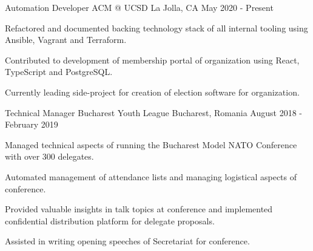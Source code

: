 
\begin{cventries}
  \cventry
    {Automation Developer}
    {ACM @ UCSD}
    {La Jolla, CA}
    {May 2020 - Present}
    {
      \begin{cvitems}
        \item {Refactored and documented backing technology stack of all internal tooling using Ansible, Vagrant and Terraform.}
        \item {Contributed to development of membership portal of organization using React, TypeScript and PostgreSQL.}
        \item {Currently leading side-project for creation of election software for organization.}
      \end{cvitems}
    }
  \cventry
    {Technical Manager}
    {Bucharest Youth League}
    {Bucharest, Romania}
    {August 2018 - February 2019}
    {
      \begin{cvitems}
        \item {Managed technical aspects of running the Bucharest Model NATO Conference with over 300 delegates.}
        \item {Automated management of attendance lists and managing logistical aspects of conference.}
        \item {Provided valuable insights in talk topics at conference and implemented confidential distribution platform for delegate proposals.}
        \item {Assisted in writing opening speeches of Secretariat for conference.}
      \end{cvitems}
    }
\end{cventries}
